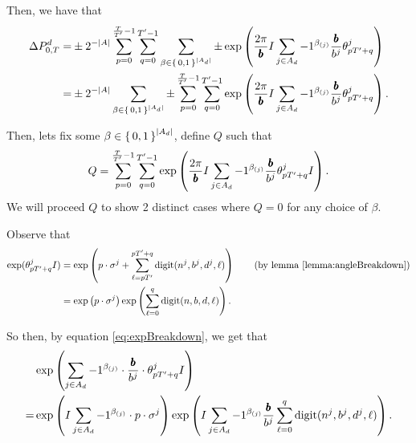 Then, we have that
\begin{align*}
 \Delta P_{0, T}^d =&
  \pm 2^{-|A|} \sum_{p= 0}^{\frac{T}{{T}'} - 1} \sum_{q = 0}^{{T}' - 1}
 \sum_{\beta \in \set{0,1}^{|A_d|}} 
 	 \pm
    \exp\left(
      	\frac{2\pi}{{\pmb{b}}} I
        \sum_{j \in A_d} -1 ^ {\beta_{(j)}}
        \frac{{\pmb{b}}}{b^j} {\theta^j_{p {T}' + q}}
      \right)\\
 =&
  \pm 2^{-|A|} 
 \sum_{\beta \in \set{0,1}^{|A_d|}} 
		\pm
     \sum_{p= 0}^{\frac{T}{{T}'} - 1} \sum_{q = 0}^{{T}' - 1}
    \exp\left(
      	\frac{2\pi}{{\pmb{b}}} I
        \sum_{j \in A_d} -1 ^ {\beta_{(j)}}
        \frac{{\pmb{b}}}{b^j} {\theta^j_{p {T}' + q}}
      \right).
\end{align*}

\newcommand{\eqWTSInnerProd}{
  \sum_{p= 0}^{\frac{\totalPeriod}{\rationalPeriodTotal} - 1} \sum_{q = 0}^{\rationalPeriodTotal - 1}
    \exp\left(
      	\commonToAngle I 
        \sum_{j \in A_d} -1 ^ {\beta_{(j)}}
        \numbToCommon 
        \rationalAngle{p \rationalPeriodTotal + q}I
      \right)}

Then, lets fix some $\beta \in \set{0, 1}^{|A_d|}$, define $Q$ such that
\begin{equation}
\label{eq:wts01}  
  Q = \eqWTSInnerProd.
\end{equation}
We will proceed $Q$ to show 2 distinct cases where $Q = 0$ for any choice of $\beta$.

Observe that 
\begin{align}
  \exp(\rationalAngle{p \rationalPeriodTotal + q}I)
  &= \exp\left(
      p \cdot \digSumPeriodic +
      \sum_{\ell = p \rationalPeriodTotal}^{p \rationalPeriodTotal + q}\mathrm{digit}(n^j, b^j, d^j, \ell)\right)\tag{by lemma \ref{lemma:angleBreakdown}} \\
      \label{eq:expBreakdown}
      &= \exp\left(p \cdot \digSumPeriodic\right) \exp\left(\sum_{\ell = 0}^{q}\mathrm{digit}(n, b, d, \ell)\right).
\end{align}

So then, by equation \eqref{eq:expBreakdown}, we get that
\begin{align}
&\exp\left(
    \sum_{j \in A_d} -1 ^ {\beta_{(j)}}
    \cdot
    \frac{{\pmb{b}}}{b^j} \cdot
    {\theta^j_{p {T}'+ q}}I
\right)\notag \\ 
\label{eq:decomposeExp}
=&
\exp\left(
    I \sum_{j \in A_d} -1 ^ {\beta_{(j)}}
    \cdot p \cdot
    \sigma^j
\right)
\exp\left(
    I \sum_{j \in A_d} -1 ^ {\beta_{(j)}} \frac{{\pmb{b}}}{b^j}
      \sum_{\ell = 0}^{q}\mathrm{digit}(n^j, b^j, d^j, \ell)
\right).
\end{align}

